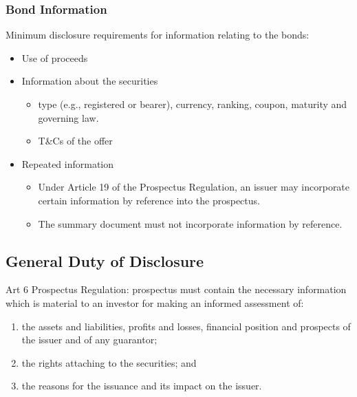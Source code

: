 \documentclass[
]{article}
\providecommand{\tightlist}{%
  \setlength{\itemsep}{0pt}\setlength{\parskip}{0pt}}
\begin{document}
\hypertarget{bond-information}{%
\subsubsection{Bond Information}\label{bond-information}}

Minimum disclosure requirements for information relating to the bonds:

\begin{itemize}
\tightlist
\item
  Use of proceeds
\item
  Information about the securities

  \begin{itemize}
  \tightlist
  \item
    type (e.g., registered or bearer), currency, ranking, coupon,
    maturity and governing law.
  \item
    T\&Cs of the offer
  \end{itemize}
\item
  Repeated information

  \begin{itemize}
  \tightlist
  \item
    Under Article 19 of the Prospectus Regulation, an issuer may
    incorporate certain information by reference into the prospectus.
  \item
    The summary document must not incorporate information by reference.
  \end{itemize}
\end{itemize}

\hypertarget{general-duty-of-disclosure}{%
\subsection{General Duty of
Disclosure}\label{general-duty-of-disclosure}}

Art 6 Prospectus Regulation: prospectus must contain the necessary
information which is material to an investor for making an informed
assessment of:

\begin{enumerate}
\tightlist
\item
  the assets and liabilities, profits and losses, financial position and
  prospects of the issuer and of any guarantor;
\item
  the rights attaching to the securities; and
\item
  the reasons for the issuance and its impact on the issuer.
\end{enumerate}
\end{document}
